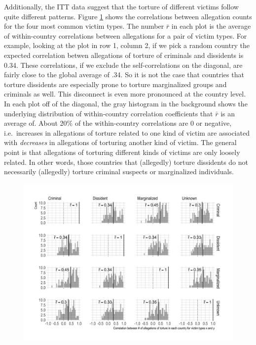 \documentclass[11pt]{article}
\begin{document}
Additionally, the ITT data suggest that the torture of different victims follow quite different patterns. Figure \ref{fig:correlation-matrix} shows the correlations between allegation counts for the four most common victim types. The number $\bar{r}$ in each plot is the average of within-country correlations between allegations for a pair of victim types. For example, looking at the plot in row 1, column 2, if we pick a random country the expected correlation betwen allegations of torture of criminals and dissidents is 0.34. These correlations, if we exclude the self-correlations on the diagonal, are fairly close to the global average of .34. So it is not the case that countries that torture dissidents are especially prone to torture marginalized groups and criminals as well. This disconnect is even more pronounced at the country level. In each plot off of the diagonal, the gray histogram in the background shows the underlying distribution of within-country correlation coefficients that $\bar{r}$ is an average of. About 20\% of the within-country correlations are 0 or negative, i.e.\ increases in allegations of torture related to one kind of victim are associated with {\em decreases} in allegations of torturing another kind of victim. The general point is that allegations of torturing different kinds of victims are only loosely related. In other words, those countries that (allegedly) torture dissidents  do not necessarily (allegedly) torture criminal suspects or marginalized individuals. 

\begin{figure}
\begin{center}
\caption{}
\label{fig:correlation-matrix}
\includegraphics[width=.99\textwidth]{../output/figures/allegations-by-victim-pairwise-correlations.png}
\end{center}
\end{figure}
\end{document}
